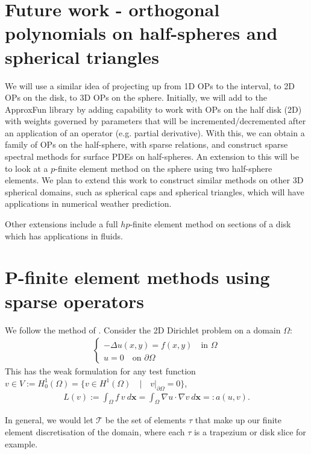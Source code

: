 \documentclass[11pt, oneside]{article}   	%
\newcommand{\sotodoinline}{\todo[color=green,inline=true]}
\newcommand{\element}{\tau}
\newcommand{\FEset}{\mathcal{T}}
\begin{document}
%
\section{Future work - orthogonal polynomials on half-spheres and spherical triangles}

\sotodoinline{Rewrite in a more "paper" like tone}

We will use a similar idea of projecting up from 1D OPs to the interval, to 2D OPs on the disk, to 3D OPs on the sphere. Initially, we will add to the ApproxFun library by adding capability to work with OPs on the half disk (2D) with weights governed by parameters that will be incremented/decremented after an application of an operator (e.g. partial derivative). With this, we can obtain a family of OPs on the half-sphere, with sparse relations, and construct sparse spectral methods for surface PDEs on half-spheres. An extension to this will be to look at a $p$-finite element method on the sphere using two half-sphere elements. We plan to extend this work to construct similar methods on other 3D spherical domains, such as spherical caps and spherical triangles, which will have applications in numerical weather prediction. 

Other extensions include a full $hp$-finite element method on sections of a disk which has applications in fluids. 

%
\appendix
%
\section{P-finite element methods using sparse operators}

We follow the method of \cite{beuchler2006new}. Consider the 2D Dirichlet problem on a domain $\Omega$:
\begin{align}
	\begin{cases}
         - \Delta u(x,y) = f(x,y) \quad \text{in } \Omega \\
         u = 0 \quad \text{on } \partial \Omega
         \end{cases}
\end{align}
This has the weak formulation for any test function $v \in V := H_0^1(\Omega) = \{v \in H^1(\Omega) \quad | \quad v|_{\partial \Omega} = 0 \}$,
\begin{align}
	L(v) := \int_\Omega f \: v \: d\mathbf{x} = \int_\Omega \nabla u \cdot \nabla v \: d\mathbf{x} =: a(u,v).
\end{align}

In general, we would let $\FEset$ be the set of elements $\element$ that make up our finite element discretisation of the domain, where each $\element$ is a trapezium or disk slice for example. 
\end{document}

